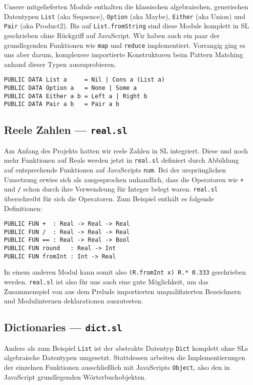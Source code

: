 \documentclass[runningheads]{llncs}
\begin{document}
Unsere mitgelieferten Module enthalten die klassischen algebraischen,
generischen Datentypen \verb|List| (aka Sequence), \verb|Option| (aka Maybe),
\verb|Either| (aka Union) und \verb|Pair| (aka Product2).
Bis auf \verb|List.fromString| sind diese Module komplett in SL geschrieben
ohne Rückgriff auf JavaScript. Wir haben auch ein paar der grundlegenden
Funktionen wie \verb|map| und \verb|reduce| implementiert. Vorrangig ging
es uns aber darum, komplexere importierte Konstruktoren beim Pattern Matching
anhand dieser Typen auszuprobieren.

\begin{verbatim}
PUBLIC DATA List a     = Nil | Cons a (List a)
PUBLIC DATA Option a   = None | Some a
PUBLIC DATA Either a b = Left a | Right b
PUBLIC DATA Pair a b   = Pair a b
\end{verbatim}

\subsection{Reele Zahlen --- \texttt{real.sl}}

Am Anfang des Projekts hatten wir reele Zahlen in SL integriert. Diese und
noch mehr Funktionen auf Reals werden jetzt in \verb|real.sl| definiert
durch Abbildung auf entsprechende Funktionen auf JavaScripts \verb|num|.
Bei der ursprünglichen Umsetzung erwies sich als ausgesprochen
unhandlich, dass die Operatoren wie \verb|+| und \verb|/| schon durch ihre
Verwendeung für Integer belegt waren. \verb|real.sl| überschreibt für sich
die Operatoren. Zum Beispiel enthält es folgende Definitionen:

\begin{verbatim}
PUBLIC FUN +  : Real -> Real -> Real
PUBLIC FUN /  : Real -> Real -> Real
PUBLIC FUN == : Real -> Real -> Bool
PUBLIC FUN round   : Real -> Int
PUBLIC FUN fromInt : Int -> Real
\end{verbatim}

In einem anderen Modul kann somit also \verb|(R.fromInt x) R.* 0.333|
geschrieben werden. \verb|real.sl| ist also für uns auch eine gute
Möglichkeit, um das Zusammenspiel von aus dem Prelude importierten
unqualifizierten Bezeichnern und Modulinternen deklarationen auszutesten.

\subsection{Dictionaries --- \texttt{dict.sl}}

Anders als zum Beispiel \verb|List| ist der abstrakte Datentyp \verb|Dict|
komplett ohne SLs algebraische Datentypen umgesetzt. Stattdessen arbeiten
die Implementierungen der einzelnen Funktionen ausschließlich mit JavaScripts
\verb|Object|, also den in JavaScript grundlegenden Wörterbuchobjekten.
\end{document}
